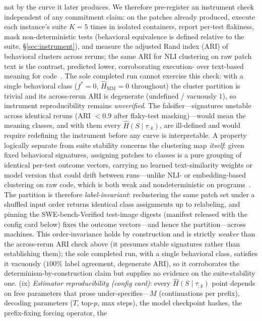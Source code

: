 \documentclass[11pt]{article}
\newcommand{\Hk}{\widehat{H}\!\left(S \mid \tau_{:k}\right)}
\begin{document}
not by the curve it later produces. We therefore pre-register an instrument check
independent of any commitment claim: on the patches already produced, execute each
instance's suite $K\!=\!5$ times in isolated containers, report per-test flakiness,
mask non-deterministic tests (behavioral equivalence is defined relative to the
suite, \S\ref{sec:instrument}), and measure the adjusted Rand index (ARI) of
behavioral clusters across reruns; the same ARI for NLI clustering on raw patch text
is the contrast, predicted lower, corroborating execution- over text-based meaning
for code~\citep{farquhar2024semantic,kuhn2023semantic}. The sole completed run cannot
exercise this check: with a single behavioral class ($f^\ast=0$,
$\widehat{H}_{\mathrm{MM}}=0$ throughout) the cluster partition is trivial and its
across-rerun ARI is degenerate (undefined / vacuously $1$), so instrument
reproducibility remains \emph{unverified}. The falsifier---signatures unstable across
identical reruns (ARI $<0.9$ after flaky-test masking)---would mean the meaning
classes, and with them every $\Hk$, are ill-defined and would require redefining the
instrument before any curve is interpretable. A property logically separate from
suite stability concerns the clustering map \emph{itself}: given fixed behavioral
signatures, assigning patches to classes is a pure grouping of identical per-test
outcome vectors, carrying no learned text-similarity weights or model version that
could drift between runs---unlike NLI- or embedding-based clustering on raw code,
which is both weak and nondeterministic on
programs~\citep{fase2026,funcentropy2026,symbolicclust2025}. The partition is
therefore \emph{label-invariant}: reclustering the same patch set under a shuffled
input order returns identical class assignments up to relabeling, and pinning the
SWE-bench-Verified test-image digests (manifest released with the config card below)
fixes the outcome vectors---and hence the partition---across machines. This
order-invariance holds by construction and is strictly \emph{weaker} than the
across-rerun ARI check above (it presumes stable signatures rather than establishing
them); the sole completed run, with a single behavioral class, satisfies it vacuously
($100\%$ label agreement, degenerate ARI), so it corroborates the
determinism-by-construction claim but supplies no evidence on the suite-stability one.
(ix) \emph{Estimator reproducibility
(config card)}: every $\Hk$ point depends on free parameters that prose
under-specifies---$M$ (continuations per prefix), decoding parameters ($T$, top-$p$,
max steps), the model checkpoint hashes, the prefix-fixing forcing operator, the
\end{document}
